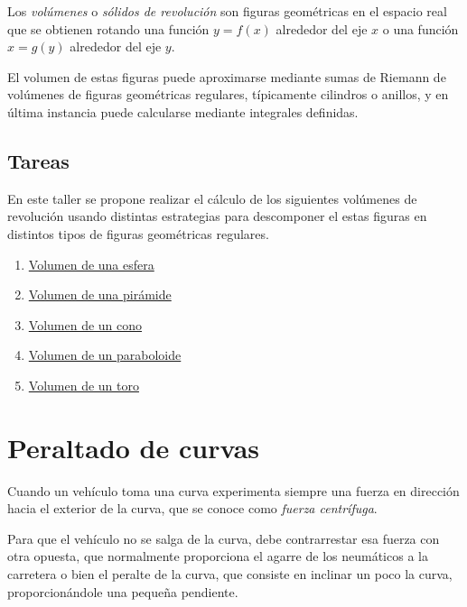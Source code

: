\documentclass[
  a4paper,
]{scrreport}
\begin{document}
Los \emph{volúmenes} o \emph{sólidos de revolución} son figuras
geométricas en el espacio real que se obtienen rotando una función
\(y=f(x)\) alrededor del eje \(x\) o una función \(x=g(y)\) alrededor
del eje \(y\).

El volumen de estas figuras puede aproximarse mediante sumas de Riemann
de volúmenes de figuras geométricas regulares, típicamente cilindros o
anillos, y en última instancia puede calcularse mediante integrales
definidas.

\section{Tareas}\label{tareas-4}

En este taller se propone realizar el cálculo de los siguientes
volúmenes de revolución usando distintas estrategias para descomponer el
estas figuras en distintos tipos de figuras geométricas regulares.

\begin{enumerate}
\def\labelenumi{\arabic{enumi}.}
\item
  \href{https://www.geogebra.org/m/nfdm8xjg}{Volumen de una esfera}
\item
  \href{https://www.geogebra.org/m/g2wu3tqw}{Volumen de una pirámide}
\item
  \href{https://www.geogebra.org/m/vfqyfuxx}{Volumen de un cono}
\item
  \href{https://www.geogebra.org/m/xugkcvn5}{Volumen de un paraboloide}
\item
  \href{https://www.geogebra.org/m/wy2uquqc}{Volumen de un toro}
\end{enumerate}


\chapter{Peraltado de curvas}\label{peraltado-de-curvas}

Cuando un vehículo toma una curva experimenta siempre una fuerza en
dirección hacia el exterior de la curva, que se conoce como \emph{fuerza
centrífuga}.

Para que el vehículo no se salga de la curva, debe contrarrestar esa
fuerza con otra opuesta, que normalmente proporciona el agarre de los
neumáticos a la carretera o bien el peralte de la curva, que consiste en
inclinar un poco la curva, proporcionándole una pequeña pendiente.
\end{document}
